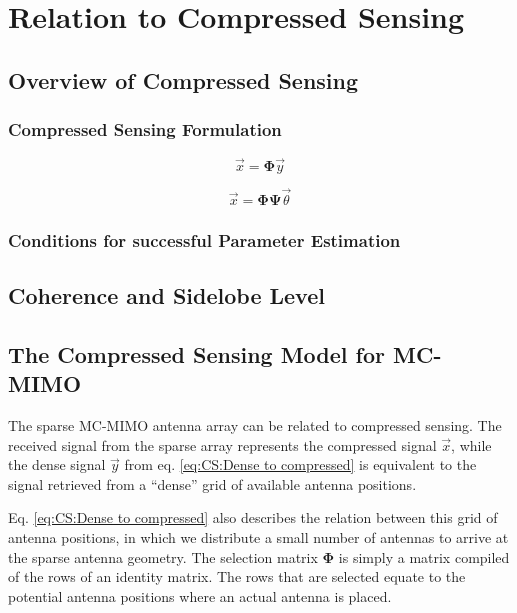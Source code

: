 \documentclass[12pt, a4paper]{scrreprt}
\newcommand{\mat}[1]{\mathbf{#1}}
\begin{document}
  \chapter{Relation to Compressed Sensing}
  \label{chap:Relation to Compressed Sensing}

  \section{Overview of Compressed Sensing}
  \label{sec:Overview of Compressed Sensing}

  \subsection{Compressed Sensing Formulation}
  \label{sub:subsection label}
  \begin{equation}
    \vec{x} = \mat{\Phi} \vec{y}
    \label{eq:CS:Dense to compressed}
  \end{equation}

  \begin{equation}
    \vec{x} = \mat{\Phi} \mat{\Psi} \vec{\theta}

  \end{equation}

  \subsection{Conditions for successful Parameter Estimation}
  \label{sub:Conditions for successful Parameter Estimation}


  \section{Coherence and Sidelobe Level}
  \label{sec:Coherence and Sidelobe Level}

  \section{The Compressed Sensing Model for MC-MIMO}
  \label{sec:The Compressed Sensing Model for MC-MIMO}
  The sparse MC-MIMO antenna array can be related to compressed sensing. The received signal from the sparse array represents the compressed signal $\vec{x}$, while the dense signal $\vec{y}$ from eq. \ref{eq:CS:Dense to compressed} is equivalent to the signal retrieved from a ``dense'' grid of available antenna positions.

  Eq. \ref{eq:CS:Dense to compressed} also describes the relation between this grid of antenna positions, in which we distribute a small number of antennas to arrive at the sparse antenna geometry. The selection matrix $\mat{\Phi}$ is simply a matrix compiled of the rows of an identity matrix. The rows that are selected equate to the potential antenna positions where an actual antenna is placed.
\end{document}
